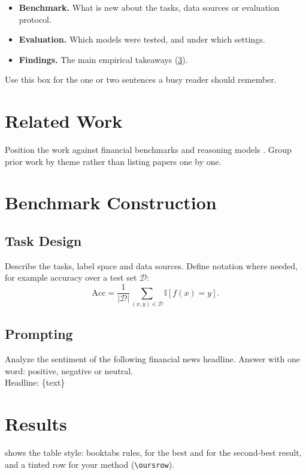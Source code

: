 \documentclass[11pt]{article}
\begin{document}
\begin{itemize}
  \item \textbf{Benchmark.} What is new about the tasks, data sources or evaluation protocol.
  \item \textbf{Evaluation.} Which models were tested, and under which settings.
  \item \textbf{Findings.} The main empirical takeaways (\cref{sec:results}).
\end{itemize}

\begin{takeaway}
Use this box for the one or two sentences a busy reader should remember.
\end{takeaway}

\section{Related Work}
Position the work against financial benchmarks \citep{xie2024finben,peng2025multifinben} and reasoning
models \citep{qian2025fino1}. Group prior work by theme rather than listing papers one by one.

\section{Benchmark Construction}
\label{sec:method}
\subsection{Task Design}
Describe the tasks, label space and data sources. Define notation where needed, for example accuracy over a test
set $\mathcal{D}$:
\begin{equation}
  \mathrm{Acc} = \frac{1}{|\mathcal{D}|}\sum_{(x,y)\in\mathcal{D}} \mathbb{I}\left[f(x) = y\right].
\end{equation}

\subsection{Prompting}
\begin{promptbox}
Analyze the sentiment of the following financial news headline. Answer with one word:
positive, negative or neutral.\\
Headline: \{text\}
\end{promptbox}

\section{Results}
\label{sec:results}
 shows the table style: booktabs rules,  for the best and  for the
second-best result, and a tinted row for your method (\texttt{\textbackslash oursrow}).
\end{document}
